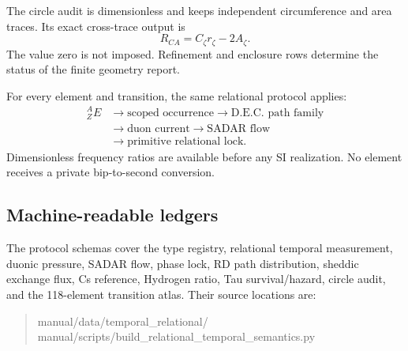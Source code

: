The circle audit is dimensionless and keeps independent circumference and area
traces.  Its exact cross-trace output is
\[
R_{CA}=C_\zeta r_\zeta-2A_\zeta.
\]
The value zero is not imposed.  Refinement and enclosure rows determine the
status of the finite geometry report.

For every element and transition, the same relational protocol applies:
\[
\begin{aligned}
{}^A_ZE
&\longrightarrow \text{scoped occurrence}
 \longrightarrow \text{D.E.C. path family}\\
&\longrightarrow \text{duon current}
 \longrightarrow \text{SADAR flow}\\
&\longrightarrow \text{primitive relational lock}.
\end{aligned}
\]
Dimensionless frequency ratios are available before any SI realization.  No
element receives a private bip-to-second conversion.

\subsection{Machine-readable ledgers}

\begin{sloppypar}
The protocol schemas cover the type registry, relational temporal measurement,
duonic pressure, SADAR flow, phase lock, RD path distribution, sheddic exchange
flux, Cs reference, Hydrogen ratio, Tau survival/hazard, circle audit, and the
118-element transition atlas.  Their source locations are:
\end{sloppypar}
\begin{quote}\small\ttfamily
manual/data/temporal\_relational/\\
manual/scripts/build\_relational\_temporal\_semantics.py
\end{quote}
